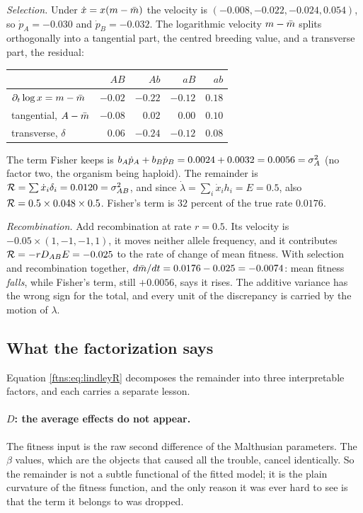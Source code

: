 \begin{example}
\emph{Selection.} Under $\dot x=x(m-\bar{m})$ the velocity is $(-0.008,-0.022,-0.024,0.054)$, so
$\dot p_A=-0.030$ and $\dot p_B=-0.032$. The logarithmic velocity $m-\bar{m}$ splits orthogonally into
a tangential part, the centred breeding value, and a transverse part, the residual:
\begin{center}
\begin{tabular}{lrrrr}
\toprule
 & $AB$ & $Ab$ & $aB$ & $ab$ \\
\midrule
$\partial_t\log x=m-\bar{m}$ & $-0.02$ & $-0.22$ & $-0.12$ & $0.18$ \\
tangential, $A-\bar{m}$ & $-0.08$ & $0.02$ & $0.00$ & $0.10$ \\
transverse, $\delta$ & $0.06$ & $-0.24$ & $-0.12$ & $0.08$ \\
\bottomrule
\end{tabular}
\end{center}
The term Fisher keeps is $b_A\dot p_A+b_B\dot p_B=0.0024+0.0032=0.0056=\sigma^{2}_{A}$ (no factor two, the
organism being haploid). The remainder is $\mathcal{R}=\sum\dot x_i\delta_i=0.0120=\sigma^2_{AB}$, and since
$\dot\lambda=\sum_i\dot x_ih_i=E=0.5$, also $\mathcal{R}=0.5\times0.048\times0.5$. Fisher's term is
$32$ percent of the true rate $0.0176$.

\emph{Recombination.} Add recombination at rate $r=0.5$. Its velocity is
$-0.05\times(1,-1,-1,1)$, it moves neither allele frequency, and it contributes
$\mathcal{R}=-rD_{AB}E=-0.025$ to the rate of change of mean fitness. With selection and recombination
together, $d\bar{m}/dt=0.0176-0.025=-0.0074$: mean fitness \emph{falls}, while Fisher's term, still
$+0.0056$, says it rises. The additive variance has the wrong sign for the total, and every unit of
the discrepancy is carried by the motion of $\lambda$.
\end{example}

\subsection{What the factorization says}

Equation \eqref{ftns:eq:lindleyR} decomposes the remainder into three interpretable factors, and each
carries a separate lesson.

\paragraph{$D$: the average effects do not appear.} The fitness input is the raw second difference
of the Malthusian parameters. The $\beta$ values, which are the objects that caused all the
trouble, cancel identically. So the remainder is not a subtle functional of the fitted model; it is
the plain curvature of the fitness function, and the only reason it was ever hard to see is that
the term it belongs to was dropped.

